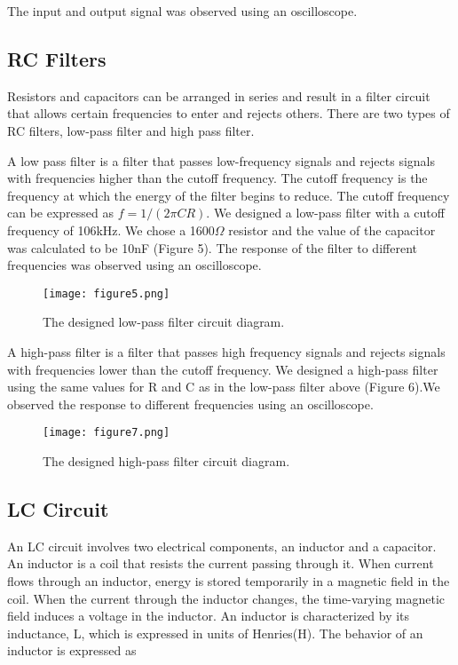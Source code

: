 \documentclass[12pt]{article}
\begin{document}
The input and output signal was observed using an oscilloscope. 

\subsection {RC Filters}
Resistors and capacitors can be arranged in series and result in a
filter circuit that allows certain frequencies to enter and rejects
others. There are two types of RC filters, low-pass filter and high pass
filter. 
 
A low pass filter is a filter that passes low-frequency signals and
rejects signals with frequencies higher than the cutoff frequency. The
cutoff frequency is the frequency at which the energy of the filter
begins to reduce. The cutoff frequency can be expressed as $f = 1/(2\pi
CR)$. We designed a low-pass filter with a cutoff frequency of
106kHz. We chose a 1600$\Omega$ resistor and the value of the capacitor was
calculated to be 10nF (Figure 5). The response of the filter to
different frequencies was observed using an oscilloscope.

\begin {figure}[!h]
\centering
\texttt{[image: figure5.png]}
\caption{\label{rvd} The designed low-pass filter circuit diagram. }
\end {figure}
 
A high-pass filter is a filter that passes high frequency signals and
rejects signals with frequencies lower than the cutoff frequency. We
designed a high-pass filter using the same values for R and C as in the
low-pass filter above (Figure 6).We observed the response to different
frequencies using an oscilloscope.

\begin {figure}[!h]
\centering
\texttt{[image: figure7.png]}
\caption{\label{rvd} The designed high-pass filter circuit diagram. }
\end {figure}

\subsection {LC Circuit}
An LC circuit involves two electrical components, an inductor and a
capacitor. An inductor is a coil that resists the current passing
through it. When current flows through an inductor, energy is stored
temporarily in a magnetic field in the coil. When the current through
the inductor changes, the time-varying magnetic field induces a voltage
in the inductor. An inductor is characterized by its inductance, L,
which is expressed in units of Henries(H).  The behavior of an inductor
is expressed as 
\end{document}
